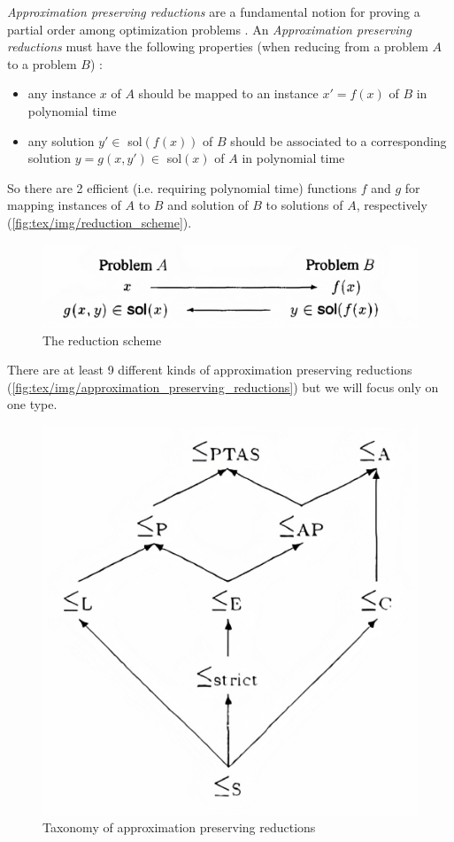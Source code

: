 \emph{Approximation preserving reductions} are a fundamental notion for proving
a partial order among optimization problems \cite{Ausiello2005}. An
\emph{Approximation preserving reductions} must have
the following properties (when reducing from a problem $A$ to a problem $B$)
\cite{DemaineFall2014}:

\begin{itemize}
	\item any instance $x$ of $A$ should be mapped to an instance $x' = f(x)$
	      of $B$ in polynomial time
	\item any solution $y' \in $ sol$(f(x))$ of $B$ should be associated to a corresponding
	      solution $y = g(x, y') \in $ sol$(x)$ of $A$ in polynomial time
\end{itemize}

So there are 2 efficient (i.e. requiring polynomial time) functions $f$ and $g$
for mapping instances of $A$ to $B$ and solution of $B$ to solutions of $A$,
respectively (\autoref{fig:tex/img/reduction_scheme}).

\begin{figure}
	\centering
	\includegraphics[width=0.6\linewidth]{tex/img/reduction_scheme.png}
	\caption{The reduction scheme \cite{Crescenzi1997ASG}}%
	\label{fig:tex/img/reduction_scheme}
\end{figure}

There are at least 9 different kinds of approximation preserving reductions
\cite{DemaineFall2014}(\autoref{fig:tex/img/approximation_preserving_reductions}) but we will
focus only on one type.

\begin{figure}[b]
	\centering
	\includegraphics[width=0.4\linewidth]{tex/img/approximation_preserving_reductions.png}
	\caption{Taxonomy of approximation preserving reductions \cite{Crescenzi1997ASG}}%
	\label{fig:tex/img/approximation_preserving_reductions}
\end{figure}

